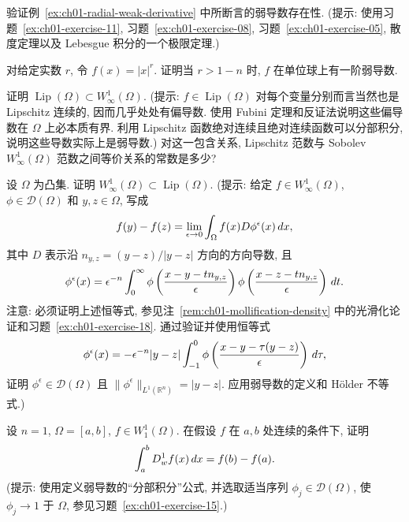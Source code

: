 \begin{MBExercise}
\label{ex:ch01-exercise-12}
验证例~\ref{ex:ch01-radial-weak-derivative} 中所断言的弱导数存在性. (提示: 使用习题~\ref{ex:ch01-exercise-11}, 习题~\ref{ex:ch01-exercise-08}, 习题~\ref{ex:ch01-exercise-05}, 散度定理以及 Lebesgue 积分的一个极限定理.)
\end{MBExercise}

\begin{MBExercise}
\label{ex:ch01-exercise-13}
对给定实数 $r$, 令 $f(x)=|x|^r$. 证明当 $r>1-n$ 时, $f$ 在单位球上有一阶弱导数.
\end{MBExercise}

\begin{MBExercise}
\label{ex:ch01-exercise-14}
证明 $\operatorname{Lip}(\Omega)\subset W_\infty^1(\Omega)$. (提示: $f\in\operatorname{Lip}(\Omega)$ 对每个变量分别而言当然也是 Lipschitz 连续的, 因而几乎处处有偏导数. 使用 Fubini 定理和反证法说明这些偏导数在 $\Omega$ 上必本质有界. 利用 Lipschitz 函数绝对连续且绝对连续函数可以分部积分, 说明这些导数实际上是弱导数.) 对这一包含关系, Lipschitz 范数与 Sobolev $W_\infty^1(\Omega)$ 范数之间等价关系的常数是多少?
\end{MBExercise}

\begin{MBExercise}
\label{ex:ch01-exercise-15}
设 $\Omega$ 为凸集. 证明 $W_\infty^1(\Omega)\subset\operatorname{Lip}(\Omega)$. (提示: 给定 $f\in W_\infty^1(\Omega)$, $\phi\in\mathcal D(\Omega)$ 和 $y,z\in\Omega$, 写成
\[
\MathBookFormulaID{formula-ch01-exercise-15-directional-identity}
f(y)-f(z)=\lim_{\epsilon\to0}\int_\Omega f(x)D\phi^\epsilon(x)\,dx,
\]
其中 $D$ 表示沿 $n_{y,z}=(y-z)/|y-z|$ 方向的方向导数, 且
\[
\MathBookFormulaID{formula-ch01-exercise-15-phi-epsilon}
\phi^\epsilon(x)=\epsilon^{-n}\int_0^\infty
\phi\left(\frac{x-y-tn_{y,z}}\epsilon\right)
\phi\left(\frac{x-z-tn_{y,z}}\epsilon\right)\,dt.
\]
注意: 必须证明上述恒等式, 参见注~\ref{rem:ch01-mollification-density} 中的光滑化论证和习题~\ref{ex:ch01-exercise-18}. 通过验证并使用恒等式
\[
\MathBookFormulaID{formula-ch01-exercise-15-phi-alternative}
\phi^\epsilon(x)=-\epsilon^{-n}|y-z|
\int_{-1}^0\phi\left(\frac{x-y-\tau(y-z)}\epsilon\right)\,d\tau,
\]
证明 $\phi^\epsilon\in\mathcal D(\Omega)$ 且 $\|\phi^\epsilon\|_{L^1(\mathbb R^n)}=|y-z|$. 应用弱导数的定义和 Hölder 不等式.)
\end{MBExercise}

\begin{MBExercise}
\label{ex:ch01-exercise-16}
设 $n=1$, $\Omega=[a,b]$, $f\in W_1^1(\Omega)$. 在假设 $f$ 在 $a,b$ 处连续的条件下, 证明
\[
\MathBookFormulaID{formula-ch01-exercise-16-fundamental-theorem}
\int_a^bD_w^1f(x)\,dx=f(b)-f(a).
\]
(提示: 使用定义弱导数的``分部积分''公式, 并选取适当序列 $\phi_j\in\mathcal D(\Omega)$, 使 $\phi_j\to1$ 于 $\Omega$, 参见习题~\ref{ex:ch01-exercise-15}.)
\end{MBExercise}

